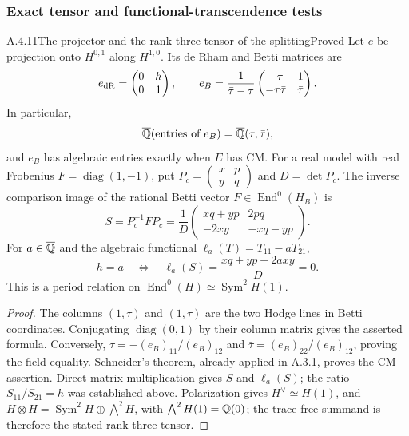 \subsubsection{Exact tensor and functional-transcendence tests}

\begin{result}{A.4.11}{The projector and the rank-three tensor of the splitting}{Proved}
Let $e$ be projection onto $H^{0,1}$ along $H^{1,0}$. Its de Rham and Betti matrices are
\[
 e_{\mathrm{dR}}=\begin{pmatrix}0&h\\0&1\end{pmatrix},\qquad
 e_B=\frac1{\bar\tau-\tau}
 \begin{pmatrix}-\tau&1\\-\tau\bar\tau&\bar\tau\end{pmatrix}.
\]
In particular,
\[
 \overline{\mathbb Q}(\text{entries of }e_B)=\overline{\mathbb Q}(\tau,\bar\tau),
\]
and $e_B$ has algebraic entries exactly when $E$ has CM.
For a real model with real Frobenius $F=\operatorname{diag}(1,-1)$, put
$P_c=\left(\begin{smallmatrix}x&p\\y&q\end{smallmatrix}\right)$ and $D=\det P_c$. The inverse comparison image of the rational Betti vector $F\in\operatorname{End}^0(H_B)$ is
\[
 S=P_c^{-1}FP_c
 =\frac1D\begin{pmatrix}xq+yp&2pq\\-2xy&-xq-yp\end{pmatrix}.
\]
For $a\in\overline{\mathbb Q}$ and the algebraic functional $\ell_a(T)=T_{11}-aT_{21}$,
\[
 h=a\quad\Longleftrightarrow\quad
 \ell_a(S)=\frac{xq+yp+2axy}{D}=0.
\]
This is a period relation on
$\operatorname{End}^0(H)\simeq\operatorname{Sym}^2H(1)$.
\end{result}
\begin{proof}
The columns $(1,\tau)$ and $(1,\bar\tau)$ are the two Hodge lines in Betti coordinates. Conjugating $\operatorname{diag}(0,1)$ by their column matrix gives the asserted formula. Conversely,
$\tau=-(e_B)_{11}/(e_B)_{12}$ and $\bar\tau=(e_B)_{22}/(e_B)_{12}$, proving the field equality. Schneider's theorem, already applied in A.3.1, proves the CM assertion. Direct matrix multiplication gives $S$ and $\ell_a(S)$; the ratio $S_{11}/S_{21}=h$ was established above. Polarization gives $H^\vee\simeq H(1)$, and
$H\otimes H=\operatorname{Sym}^2H\oplus\bigwedge^2H$, with $\bigwedge^2H(1)=\mathbb Q(0)$; the trace-free summand is therefore the stated rank-three tensor.
\end{proof}

